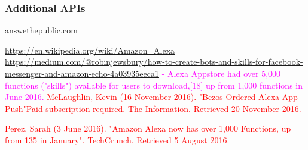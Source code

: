 \subsubsection*{Additional APIs}





answethepublic.com








\url{https://en.wikipedia.org/wiki/Amazon_Alexa}
\url{https://medium.com/@robinjewsbury/how-to-create-bots-and-skills-for-facebook-messenger-and-amazon-echo-4a03935eeca1}
\textcolor{magenta}{
- Alexa Appstore had over 5,000 functions ("skills") available for users to download,[18] up from 1,000 functions in June 2016.
}
\textcolor{red}{McLaughlin, Kevin (16 November 2016). "Bezos Ordered Alexa App Push"Paid subscription required. The Information. Retrieved 20 November 2016.}

\textcolor{red}{Perez, Sarah (3 June 2016). "Amazon Alexa now has over 1,000 Functions, up from 135 in January". TechCrunch. Retrieved 5 August 2016.}




